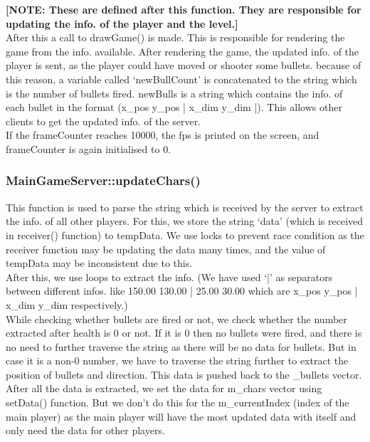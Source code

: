 \documentclass{article}
\begin{document}
 \textbf{[NOTE: These are defined after this function. They are responsible for updating the info. of the player and the level.]} \\

After this a call to drawGame() is made. This is responsible for rendering the game from the info. available. After rendering the game, the updated info. of the player is sent, as the player could have moved or shooter some bullets. because of this reason, a variable called ‘newBullCount’ is concatenated to the string which is the number of bullets fired. newBulls is a string which contains the info. of each bullet in the format (x\_pos y\_pos | x\_dim y\_dim |). This allows other clients to get the updated info. of the server. \\

If the frameCounter reaches 10000, the fps is printed on the screen, and frameCounter is again initialised to 0. 
\newline

\subsubsection{MainGameServer::updateChars() }
This function is used to parse the string which is received by the server to extract the info. of all other players. For this, we store the string ‘data’ (which is received in receiver() function) to tempData. We use locks to prevent race condition as the receiver function may be updating the data many times, and the value of tempData may be inconsistent due to this. \\

After this, we use loops to extract the info. (We have used ‘|’ as separators between different infos. like 150.00 130.00 | 25.00 30.00 which are x\_pos y\_pos | x\_dim y\_dim respectively.) \\

While checking whether bullets are fired or not, we check whether the number extracted after health is 0 or not. If it is 0 then no bullets were fired, and there is no need to further traverse the string as there will be no data for bullets. But in case it is a non-0 number, we have to traverse the string further to extract the position of bullets and direction. This data is pushed back to the \_bullets vector. \\

After all the data is extracted, we set the data for m\_chars vector using setData() function. But we don’t do this for the m\_currentIndex (index of the main player) as the main player will have the most updated data with itself and only need the data for other players. \\
\newline
\end{document}
